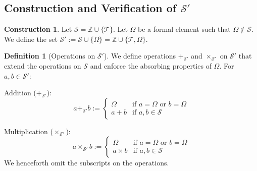 \documentclass[11pt, a4paper]{article}
\theoremstyle{plain}
\theoremstyle{definition}
\newtheorem{definition}[theorem]{Definition}
\newtheorem{construction}[theorem]{Construction}
\numberwithin{equation}{section}
\newcommand{\Z}{\mathbb{Z}}
\newcommand{\Tobj}{\mathcal{T}} %
\newcommand{\OmegaObj}{\Omega} %
\newcommand{\SemiringS}{\mathcal{S}}
\newcommand{\SemiringSPrime}{\mathcal{S}'}
\begin{document}
\subsection{Construction and Verification of $\SemiringSPrime$}

\begin{construction}\label{const:SPrime}
Let $\SemiringS = \Z \cup \{\Tobj\}$. Let $\OmegaObj$ be a formal element such that $\OmegaObj \notin \SemiringS$. We define the set $\SemiringSPrime := \SemiringS \cup \{\OmegaObj\} = \Z \cup \{\Tobj, \OmegaObj\}$.
\end{construction}

\begin{definition}[Operations on $\SemiringSPrime$]\label{def:operations_SPrime}
We define operations $+_{\SemiringSPrime}$ and $\times_{\SemiringSPrime}$ on $\SemiringSPrime$ that extend the operations on $\SemiringS$ and enforce the absorbing properties of $\OmegaObj$. For $a, b \in \SemiringSPrime$:

Addition ($+_{\SemiringSPrime}$):
\begin{equation}\label{eq:add_Sprime}
a+_{\SemiringSPrime} b := \begin{cases}
    \OmegaObj & \text{if } a = \OmegaObj \text{ or } b = \OmegaObj \\
    a+b & \text{if } a, b \in \SemiringS
\end{cases}
\end{equation}

Multiplication ($\times_{\SemiringSPrime}$):
\begin{equation}\label{eq:mult_Sprime}
a\times_{\SemiringSPrime} b := \begin{cases}
    \OmegaObj & \text{if } a = \OmegaObj \text{ or } b = \OmegaObj \\
    a\times b & \text{if } a, b \in \SemiringS
\end{cases}
\end{equation}
We henceforth omit the subscripts on the operations.
\end{definition}
\end{document}
